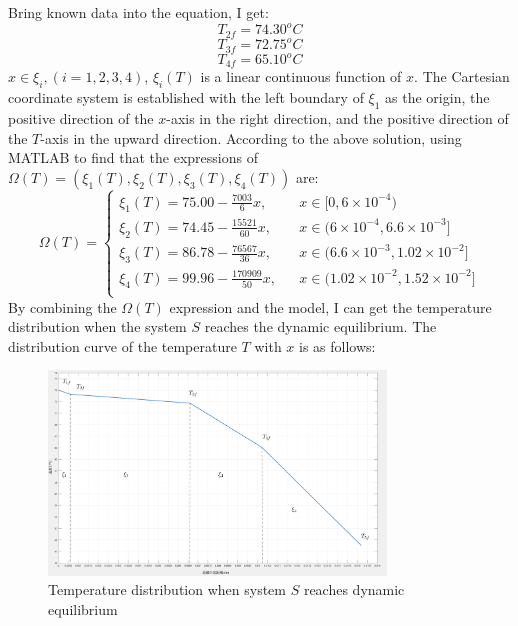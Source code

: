 \documentclass[12pt]{ctexart}
\begin{document}
\indent Bring known data into the equation, I get:
\[T_{2f} = 74.30^{o}C\]
\[T_{3f} = 72.75^{o}C\]
\[T_{4f} = 65.10^{o}C\]
\indent $x\in \xi_{i},(i=1,2,3,4)$, $\xi_{i}(T)$ is a linear continuous function of $x$. The Cartesian coordinate system is established with the left boundary of $\xi_{1}$ as the origin, the positive direction of the $x$-axis in the right direction, and the positive direction of the $T$-axis in the upward direction. According to the above solution, using MATLAB to find that the expressions of $\Omega(T) = (\xi_1 (T), \xi_2 (T), \xi_3 (T), \xi_4 (T))$ are:\\
\[
\Omega(T)=
\left\{
    \begin{array}{rcl}
        \xi_{1}(T) = 75.00 - \frac{7003}{6}x,       &   & {x\in [0, 6\times 10^{-4})}\\
        \xi_{2}(T) = 74.45 - \frac{15521}{60}x,     &   & {x\in (6\times 10^{-4}, 6.6\times 10^{-3}]}\\
        \xi_{3}(T) = 86.78 - \frac{76567}{36}x,     &   & {x\in (6.6\times 10^{-3}, 1.02\times 10^{-2}]}\\
    \xi_{4}(T) = 99.96 - \frac{170909}{50}x,    &   & {x\in (1.02\times 10^{-2}, 1.52\times 10^{-2}]}\\
    \end{array}
\right.
\]
\indent By combining the $\Omega(T)$ expression and the model, I can get the temperature distribution when the system $S$ reaches the dynamic equilibrium. The distribution curve of the temperature $T$ with $x$ is as follows:
\begin{figure}[H]
\centering
\includegraphics[width=0.8\textwidth]{3.png}
\caption{Temperature distribution when system $S$ reaches dynamic equilibrium}
\end{figure}
\end{document}
